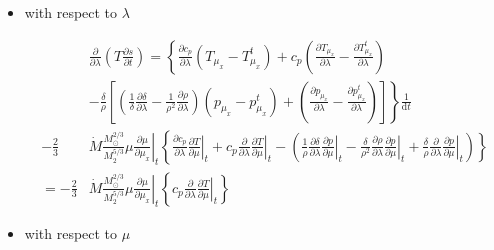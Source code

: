 \documentclass[12pt,a4paper]{article}
\newcommand{\pfird}[2][]{\frac{\partial#1}{\partial#2}}
\newcommand{\dd}[1]{\mathrm{d}#1}
\begin{document}
\begin{itemize}
  \item with respect to $\lambda$

  \begin{align}
    &\pfird[]{\lambda}\left(T\pfird[s]{t}\right) = \left\{\pfird[c_p]{\lambda}\left(T_{\mu_x} - T_{\mu_x}^t\right) + c_p\left(\pfird[T_{\mu_x}]{\lambda} - \pfird[T_{\mu_x}^t]{\lambda}\right)\right.\nonumber\\
    &\left.- \frac{\delta}{\rho}\left[\left(\frac{1}{\delta}\pfird[\delta]{\lambda} - \frac{1}{\rho^2}\pfird[\rho]{\lambda}\right)\left(p_{\mu_x} - p_{\mu_x}^t\right)  + \left(\pfird[p_{\mu_x}]{\lambda} - \pfird[p_{\mu_x}^t]{\lambda}\right)\right]\right\}\frac{1}{\dd{t}}\nonumber\\
    -\frac{2}{3}&\dot{M}\frac{M_\odot^{2/3}}{M_2^{5/3}}\mu\left.\pfird[\mu]{\mu_x}\right|_t\left\{\pfird[c_p]{\lambda}\left.\pfird[T]{\mu}\right|_t + c_p\pfird[]{\lambda}\left.\pfird[T]{\mu}\right|_t - \left(\frac{1}{\rho}\pfird[\delta]{\lambda}\left.\pfird[p]{\mu}\right|_t - \frac{\delta}{\rho^2}\pfird[\rho]{\lambda}\left.\pfird[p]{\mu}\right|_t + \frac{\delta}{\rho}\pfird[]{\lambda}\left.\pfird[p]{\mu}\right|_t\right)\right\}\nonumber\\
    = -\frac{2}{3}&\dot{M}\frac{M_\odot^{2/3}}{M_2^{5/3}}\mu\left.\pfird[\mu]{\mu_x}\right|_t\left\{c_p\pfird[]{\lambda}\left.\pfird[T]{\mu}\right|_t \right\}
  \end{align}

  \item with respect to $\mu$


\end{itemize}
\end{document}
